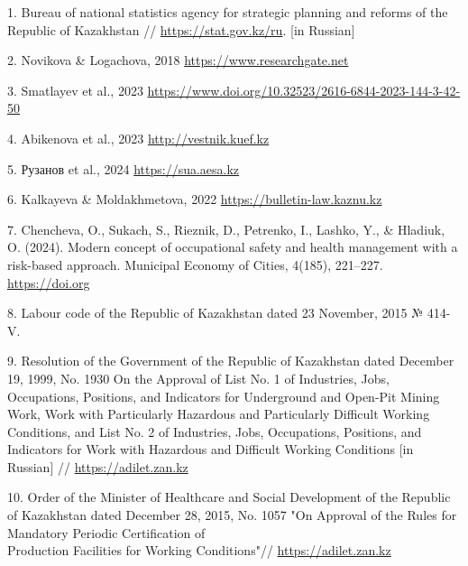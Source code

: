 \begin{references}
1. Bureau of national statistics agency for strategic planning and
reforms of the Republic of Kazakhstan //
\href{https://stat.gov.kz/ru}{https://stat.gov.kz/ru}. {[}in Russian{]}

2. Novikova \& Logachova, 2018 \href{https://www.researchgate.net/publication/328605049_Social_guarantees_for_persons_employed_in_industry_on_labour_conditions}{https://www.researchgate.net}

3. Smatlayev et al., 2023
\href{https://www.doi.org/10.32523/2616-6844-2023-144-3-42-50}{https://www.doi.org/10.32523/2616-6844-2023-144-3-42-50}

4. Abikenova et al., 2023
\href{http://vestnik.kuef.kz/web/uploads/file-vestnik/355030862d39f301e86c59a3e880429a.pdf}{http://vestnik.kuef.kz}

5. Рузанов et al., 2024
\href{https://sua.aesa.kz/main/article/view/222/192}{https://sua.aesa.kz}

6. Kalkayeva \& Moldakhmetova, 2022
\href{https://bulletin-law.kaznu.kz/index.php/journal/article/view/2663}{https://bulletin-law.kaznu.kz}

7. Chencheva, O., Sukach, S., Rieznik, D., Petrenko, I., Lashko, Y., \&
Hladiuk, O. (2024). Modern concept of occupational safety and health
management with a risk-based approach. Municipal Economy of Cities,
4(185), 221--227.
\href{https://doi.org/10.33042/2522-1809-2024-4-185-221-227}{https://doi.org}

8. Labour code of the Republic of Kazakhstan dated 23 November, 2015 №
414-V.

9. Resolution of the Government of the Republic of Kazakhstan dated
December 19, 1999, No. 1930 On the Approval of List No. 1 of Industries,
Jobs, Occupations, Positions, and Indicators for Underground and
Open-Pit Mining Work, Work with Particularly Hazardous and Particularly
Difficult Working Conditions, and List No. 2 of Industries, Jobs,
Occupations, Positions, and Indicators for Work with Hazardous and
Difficult Working Conditions {[}in Russian{]} //
\href{https://adilet.zan.kz/rus/docs/P990001930_/history}{https://adilet.zan.kz}

10. Order of the Minister of Healthcare and Social Development of the
Republic of Kazakhstan dated December 28, 2015, No. 1057 "On Approval of
the Rules for Mandatory Periodic Certification of \\Production Facilities
for Working Conditions"//
\href{https://adilet.zan.kz/rus/docs/V1500012743}{https://adilet.zan.kz}


\end{references}
